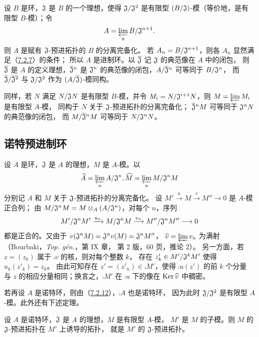 设 $B$ 是环，$\mathfrak J$ 是 $B$ 的一个理想，使得 $\mathfrak J/\mathfrak J^2$ 是有限型
$(B/\mathfrak J)$-模（等价地，是有限型 $B$-模）；令
\[
 A=\varprojlim_n B/\mathfrak J^{n+1}.
\]
则 $A$ 是赋有 $\mathfrak J$-预进拓扑的 $B$ 的分离完备化。
若 $A_n=B/\mathfrak J^{n+1}$，则各 $A_n$ 显然满足（\hyperlink{para:0:7.2.7}{7.2.7}）的条件；
所以 $A$ 是进制环。以 $\overline{\mathfrak J}$ 记 $\mathfrak J$ 的典范像在 $A$ 中的闭包，
则 $\overline{\mathfrak J}$ 是 $A$ 的定义理想，$\overline{\mathfrak J}{}^n$ 是
$\mathfrak J^n$ 的典范像的闭包，$A/\overline{\mathfrak J}{}^n$ 可等同于 $B/\mathfrak J^n$，
而 $\overline{\mathfrak J}/\overline{\mathfrak J}{}^2$ 与 $\mathfrak J/\mathfrak J^2$
作为 $(A/\overline{\mathfrak J})$-模同构。

同样，若 $N$ 满足 $N/\mathfrak J N$ 是有限型 $B$-模，并令
$M_i=N/\mathfrak J^{i+1}N$，则 $M=\varprojlim M_i$ 是有限型 $A$-模，
同构于 $N$ 关于 $\mathfrak J$-预进拓扑的分离完备化；
$\overline{\mathfrak J}{}^nM$ 可等同于 $\mathfrak J^nN$ 的典范像的闭包，
而 $M/\overline{\mathfrak J}{}^nM$ 可等同于 $N/\mathfrak J^nN$。



\par

\subsection{诺特预进制环}\hypertarget{heading:0:7.3}{}

设 $A$ 是环，$\mathfrak J$ 是 $A$ 的理想，$M$ 是 $A$-模。以
\[
 \widehat{A}=\varprojlim_n A/\mathfrak J^n,
 \widehat{M}=\varprojlim_n M/\mathfrak J^nM
\]
分别记 $A$ 和 $M$ 关于 $\mathfrak J$-预进拓扑的分离完备化。
设 $M'\xrightarrow{u}M\xrightarrow{v}M''\to0$ 是 $A$-模正合列；
由 $M/\mathfrak J^nM=M\otimes_A(A/\mathfrak J^n)$，对每个 $n$，序列
\[
 M'/\mathfrak J^nM'\xrightarrow{u_n}M/\mathfrak J^nM
 \xrightarrow{v_n}M''/\mathfrak J^nM''\longrightarrow0
\]
都是正合的。又由于
$v(\mathfrak J^nM)=\mathfrak J^nv(M)=\mathfrak J^nM''$，
$\widehat{v}=\varprojlim v_n$ 为满射（Bourbaki，\textit{Top. gén.}，第 IX 章，
第 2 版，60 页，推论 2）。
另一方面，若 $z=(z_k)$ 属于 $\comp v$ 的核，则对每个整数 $k$，
存在 $z'_k\in M'/\mathfrak J^kM'$ 使得 $u_k(z'_k)=z_k$。
由此可知存在 $z'=(z'_n)\in\comp{M'}$，使得 $\comp u(z')$ 的前 $k$ 个分量
与 $z$ 的相应分量相同；换言之，$\comp{M'}$ 在 $\comp u$ 下的像在
$\operatorname{Ker}\widehat{v}$ 中稠密。

若再设 $A$ 是诺特环，则由（\hyperlink{para:0:7.2.12}{7.2.12}），$\comp A$ 也是诺特环，
因为此时 $\mathfrak J/\mathfrak J^2$ 是有限型 $A$-模。此外还有下述定理。

设 $A$ 是诺特环，$\mathfrak J$ 是 $A$ 的理想，$M$ 是有限型 $A$-模，
$M'$ 是 $M$ 的子模。则 $M$ 的 $\mathfrak J$-预进拓扑在 $M'$ 上诱导的拓扑，
就是 $M'$ 的 $\mathfrak J$-预进拓扑。

